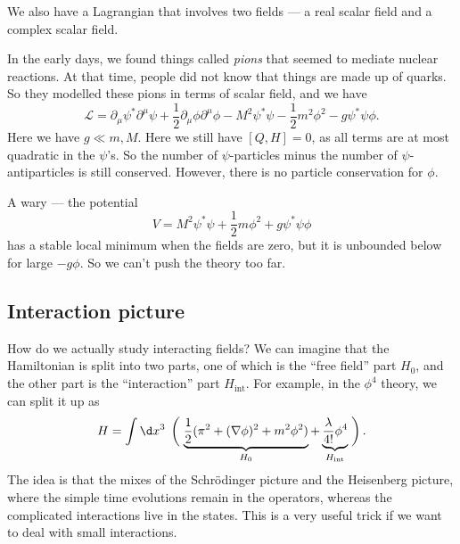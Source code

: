 \documentclass[a4paper]{article}
\begin{document}
We also have a Lagrangian that involves two fields --- a real scalar field and a complex scalar field.
\begin{eg}
  In the early days, we found things called \emph{pions} that seemed to mediate nuclear reactions. At that time, people did not know that things are made up of quarks. So they modelled these pions in terms of scalar field, and we have
  \[
    \mathcal{L} = \partial_\mu \psi^* \partial^\mu \psi + \frac{1}{2} \partial_\mu \phi \partial^\mu \phi - M^2 \psi^* \psi - \frac{1}{2} m^2 \phi^2 - g \psi^* \psi \phi.
  \]
  Here we have $g \ll m, M$. Here we still have $[Q, H] = 0$, as all terms are at most quadratic in the $\psi$'s. So the number of $\psi$-particles minus the number of $\psi$-antiparticles is still conserved. However, there is no particle conservation for $\phi$.

  A wary --- the potential
  \[
    V = M^2 \psi^* \psi + \frac{1}{2} m \phi^2 + g \psi^*\psi \phi
  \]
  has a stable local minimum when the fields are zero, but it is unbounded below for large $-g \phi$. So we can't push the theory too far.
\end{eg}

\subsection{Interaction picture}
How do we actually study interacting fields? We can imagine that the Hamiltonian is split into two parts, one of which is the ``free field'' part $H_0$, and the other part is the ``interaction'' part $H_{\mathrm{int}}$. For example, in the $\phi^4$ theory, we can split it up as
\[
  H = \int\d x^3\;\left(\vphantom{\frac{\lambda}{4}}\right.\underbrace{\frac{1}{2} (\pi^2 + (\nabla \phi)^2 + m^2 \phi^2)}_{H_0} + \underbrace{\frac{\lambda}{4!} \phi^4}_{H_{\mathrm{int}}}\left.\vphantom{\frac{\lambda}{4!}}\right).
\]
The idea is that the  mixes of the Schr\"odinger picture and the Heisenberg picture, where the simple time evolutions remain in the operators, whereas the complicated interactions live in the states. This is a very useful trick if we want to deal with small interactions.
\end{document}
